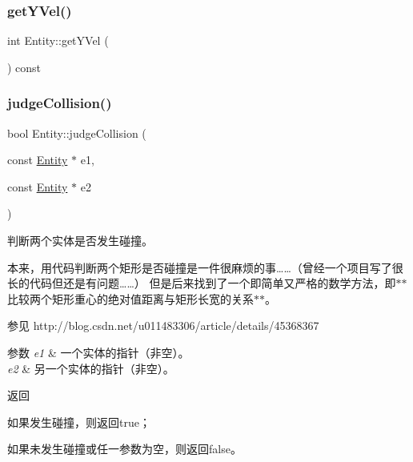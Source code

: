 \mbox{\label{class_entity_abaf01d725e35883d60f1fec3f39a8ea0}} 
\subsubsection{\texorpdfstring{get\+Y\+Vel()}{getYVel()}}
{\footnotesize\ttfamily int Entity\+::get\+Y\+Vel (\begin{DoxyParamCaption}{ }\end{DoxyParamCaption}) const\hspace{0.3cm}{\ttfamily [inline]}}

\mbox{\label{class_entity_afeab7f54f15446e13fbf218eccb8be53}} 
\subsubsection{\texorpdfstring{judge\+Collision()}{judgeCollision()}}
{\footnotesize\ttfamily bool Entity\+::judge\+Collision (\begin{DoxyParamCaption}\item[{const \hyperlink{class_entity}{Entity} $\ast$}]{e1,  }\item[{const \hyperlink{class_entity}{Entity} $\ast$}]{e2 }\end{DoxyParamCaption})\hspace{0.3cm}{\ttfamily [static]}}



判断两个实体是否发生碰撞。 

本来，用代码判断两个矩形是否碰撞是一件很麻烦的事……（曾经一个项目写了很长的代码但还是有问题……） 但是后来找到了一个即简单又严格的数学方法，即$\ast$$\ast$比较两个矩形重心的绝对值距离与矩形长宽的关系$\ast$$\ast$。 \begin{DoxySeeAlso}{参见}
http\+://blog.\+csdn.\+net/u011483306/article/details/45368367


\end{DoxySeeAlso}



\begin{DoxyParams}{参数}
{\em e1} & 一个实体的指针（非空）。\\
\hline
{\em e2} & 另一个实体的指针（非空）。 \\
\hline
\end{DoxyParams}
\begin{DoxyReturn}{返回}

\begin{DoxyItemize}
\item 如果发生碰撞，则返回true；
\item 如果未发生碰撞或任一参数为空，则返回false。 
\end{DoxyItemize}
\end{DoxyReturn}
\mbox{\label{class_entity_a372b9155542c8a228a4f1305f5f67341}} 
